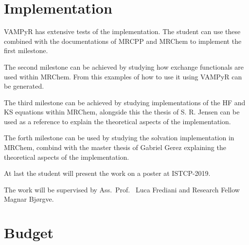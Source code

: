 \documentclass[12pt]{article}
\begin{document}
\section{Implementation}

VAMPyR has extensive tests of the implementation. The student can use these
combined with the documentations of \ac{MRCPP} and \ac{MRChem} to implement
the first milestone.

The second milestone can be achieved by studying how exchange functionals
are used within \ac{MRChem}. From this examples of how to use it using VAMPyR
can be generated.

The third milestone can be achieved by studying implementations of the
\ac{HF} and \ac{KS} equations within \ac{MRChem}, alongside this the
thesis of S. R. Jensen can be used as a reference to explain the
theoretical aspects of the implementation.

The forth milestone can be used by studying the solvation implementation
in \ac{MRChem}, combind with the master thesis of Gabriel Gerez explaining
the theoretical aspects of the implementation.

At last the student will present the work on a poster at ISTCP-2019.


The work will be supervised by Ass.~Prof.~ Luca Frediani and Research Fellow
Magnar Bj\o rgve.

\section{Budget}





\end{document}
